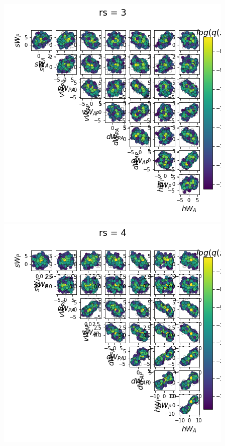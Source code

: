 \documentclass[11pt]{article}
\begin{document}
\begin{center}
\includegraphics[scale=0.33]{figs/Z_SC_full_c=0_p=80_rs=3.png} \\
\includegraphics[scale=0.33]{figs/Z_SC_full_c=0_p=80_rs=4.png}

\end{center}
\end{document}
